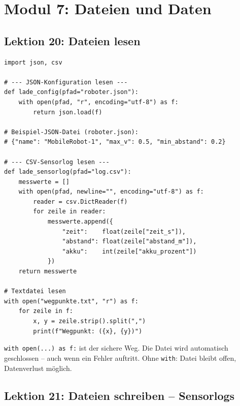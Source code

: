 \chapter{Modul 7: Dateien und Daten}

\section{Lektion 20: Dateien lesen}

\begin{lstlisting}
import json, csv

# --- JSON-Konfiguration lesen ---
def lade_config(pfad="roboter.json"):
    with open(pfad, "r", encoding="utf-8") as f:
        return json.load(f)

# Beispiel-JSON-Datei (roboter.json):
# {"name": "MobileRobot-1", "max_v": 0.5, "min_abstand": 0.2}

# --- CSV-Sensorlog lesen ---
def lade_sensorlog(pfad="log.csv"):
    messwerte = []
    with open(pfad, newline="", encoding="utf-8") as f:
        reader = csv.DictReader(f)
        for zeile in reader:
            messwerte.append({
                "zeit":    float(zeile["zeit_s"]),
                "abstand": float(zeile["abstand_m"]),
                "akku":    int(zeile["akku_prozent"])
            })
    return messwerte

# Textdatei lesen
with open("wegpunkte.txt", "r") as f:
    for zeile in f:
        x, y = zeile.strip().split(",")
        print(f"Wegpunkt: ({x}, {y})")
\end{lstlisting}

\begin{merksatz}
\texttt{with open(...) as f:} ist der sichere Weg. Die Datei wird automatisch geschlossen -- auch wenn ein Fehler auftritt. Ohne \texttt{with}: Datei bleibt offen, Datenverlust möglich.
\end{merksatz}

\section{Lektion 21: Dateien schreiben -- Sensorlogs}

